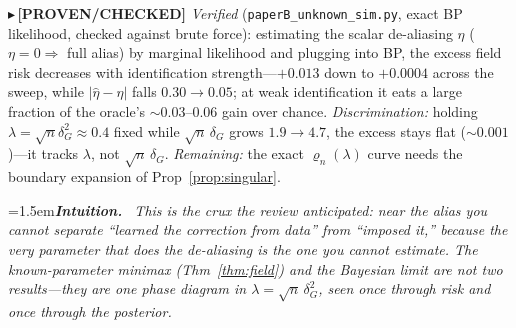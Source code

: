 \documentclass[11pt]{article}
\newcommand{\PROVEN}[1]{{\color{teal}\small$\blacktriangleright$\,\textbf{[PROVEN/CHECKED]} #1}}
\newenvironment{intuition}{\par\smallskip\noindent\hangindent=1.5em\textbf{\itshape Intuition.}\itshape\ \ignorespaces}{\par\smallskip}
\begin{document}
\PROVEN{\emph{Verified} (\texttt{paperB\_unknown\_sim.py}, exact BP likelihood, checked against brute force):
estimating the scalar de-aliasing $\eta$ ($\eta{=}0\Rightarrow$ full alias) by marginal likelihood and plugging
into BP, the excess field risk decreases with identification strength---$+0.013$ down to $+0.0004$ across the
sweep, while $|\hat\eta-\eta|$ falls $0.30\!\to\!0.05$; at weak identification it eats a large fraction of the
oracle's $\sim\!0.03$--$0.06$ gain over chance. \emph{Discrimination:} holding $\lambda=\sqrt n\delta_G^2\approx0.4$
fixed while $\sqrt n\,\delta_G$ grows $1.9\!\to\!4.7$, the excess stays flat ($\sim\!0.001$)---it tracks $\lambda$,
not $\sqrt n\,\delta_G$. \emph{Remaining:} the exact $\varrho_n(\lambda)$ curve needs the boundary expansion of
Prop~\ref{prop:singular}.}
\begin{intuition}
This is the crux the review anticipated: near the alias you cannot separate ``learned the correction from data''
from ``imposed it,'' because the very parameter that does the de-aliasing is the one you cannot estimate. The
known-parameter minimax (Thm~\ref{thm:field}) and the Bayesian limit are not two results---they are one
phase diagram in $\lambda=\sqrt n\,\delta_G^2$, seen once through risk and once through the posterior.
\end{intuition}
\end{document}
